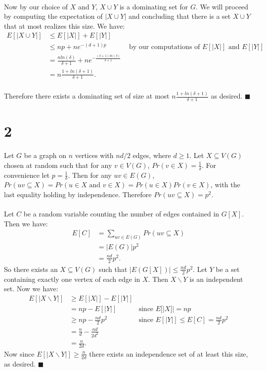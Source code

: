 \documentclass[letterpaper,12pt,oneside,onecolumn]{report}
\begin{document}
\paragraph{}
Now by our choice of $X$ and $Y$, $X \cup Y$ is a dominating set for $G$. We will proceed by computing the expectation of $|X \cup Y|$ and concluding that there is a set $X \cup Y$ that at most realizes this size. We have:
\begin{align*}
E[|X \cup Y|] &\leq E[|X|] + E[|Y|] \\
&\leq  np + ne^{-(d+1)p} &\text{ by our computations of $E[|X|]$ and $E[|Y|]$}\\
&= \frac{n ln(\delta)}{\delta + 1} + ne^{-\frac{(\delta + 1)ln(\delta)}{\delta+1}} \\
&= n\frac{1 + ln(\delta + 1)}{\delta + 1}.
\end{align*}
\paragraph{}
Therefore there exists a dominating set of size at most $n\frac{1 + ln(\delta + 1)}{\delta + 1}$ as desired. $\blacksquare$
\section*{2}
\paragraph{}
Let $G$ be a graph on $n$ vertices with $nd/2$ edges, where $d \geq 1$. Let $X \subseteq V(G)$ chosen at random such that for any $v \in V(G)$, $Pr(v \in X) = \frac{1}{\delta}$. For convenience let $p = \frac{1}{\delta}$. Then for any $uv \in E(G)$, $Pr(uv \subseteq X) = Pr(u \in X \text{ and } v \in X) = Pr(u \in X)Pr(v \in X)$, with the last equality holding by independence. Therefore $Pr(uv \subseteq X) = p^2$.
\paragraph{}
Let $C$ be a random variable counting the number of edges contained in $G[X]$. Then we have:
\begin{align*}
E[C] &= \sum_{uv \in E(G)} Pr(uv \subseteq X) \\
&= |E(G)|p^2 \\
&= \frac{nd}{2}p^2.
\end{align*}
So there exists an $X \subseteq V(G)$ such that $|E(G[X])| \leq \frac{nd}{2} p^2$. Let $Y$ be a set containing exactly one vertex of each edge in $X$. Then $X \backslash Y$ is an independent set. Now we have:
\begin{align*}
E[|X \backslash Y|] &\geq E[|X|] - E[|Y|] \\
&= np - E[|Y|] &\text{since $E[|X]| = np$}\\
&\geq np - \frac{nd}{2} p^2 &\text{since $E[|Y|] \leq E[C] = \frac{nd}{2} p^2$}\\
&= \frac{n}{d} - \frac{nd}{2d^2} \\
&= \frac{n}{2d}.
\end{align*}
Now since $E[|X \backslash Y|] \geq \frac{n}{2d}$ there exists an independence set of at least this size, as desired. $\blacksquare$
\end{document}
